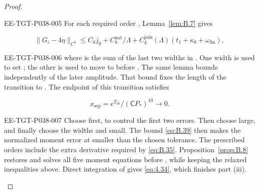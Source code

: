 \begin{proof}
\begin{EESegment}{EE-TGT-P038-005}
For each required order , Lemma~\ref{lem:B.7} gives
\end{EESegment}
\[
\lVert G_i-4\eta\rVert_{C^k}
\le C_kj_0+C_k^{\mathrm{nat}}/\Lambda
   +C_k^{\mathrm{join}}(\Lambda)(t_1+\kappa_0+\omega_{\mathrm{fin}}),
\]
\begin{EESegment}{EE-TGT-P038-006}
where  is the sum of the last two widths in
. One width is used to set
; the other is used to move
 to  before
. The same lemma bounds
 independently of the later amplitude. That
bound fixes the length  of the transition to
. The endpoint of this transition satisfies
\end{EESegment}
\[
x_{\mathrm{sep}}=e^{T_{\mathrm{sh}}}/(\mathsf C P_*)^{10}\longrightarrow0.
\]
\begin{EESegment}{EE-TGT-P038-007}
Choose  first, to control the first two errors. Then choose
 large, and finally choose the widths and
 small. The bound \eqref{eq:B.39} then makes the normalized moment
error at  smaller than the chosen tolerance. The prescribed orders
include the extra derivative required by \eqref{eq:B.35}.
Proposition~\ref{prop:B.8} restores  and solves all five moment
equations before , while keeping the relaxed inequalities above.
Direct integration of  gives \eqref{eq:4.34}, which finishes part (iii).
\end{EESegment}
\end{proof}

